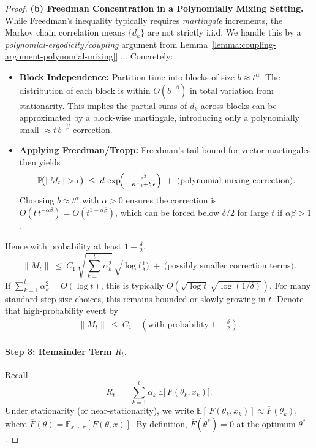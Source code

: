 \begin{proof}
\textbf{(b) Freedman Concentration in a Polynomially Mixing Setting.}\;\\
While Freedman’s inequality typically requires \emph{martingale} increments, the Markov chain correlation means $\{d_k\}$ are not strictly i.i.d.  We handle this by a \emph{polynomial-ergodicity/coupling} argument from Lemma~\ref{lemma:coupling-argument-polynomial-mixing}]{...}.  Concretely:
\begin{itemize}
\item \textbf{Block Independence:} Partition time into blocks of size $b\approx t^\alpha$.  The distribution of each block is within $O(b^{-\beta})$ in total variation from stationarity.  This implies the partial sums of $d_k$ across blocks can be approximated by a block-wise martingale, introducing only a polynomially small $\approx t\,b^{-\beta}$ correction.
\item \textbf{Applying Freedman/Tropp:} Freedman’s tail bound for vector martingales \cite{tropp2011freedman,freedman1975tail} then yields
\[
  \mathbb{P}\!\bigl(\|M_t\|>\epsilon\bigr)
  \;\le\;
  d\,
  \exp\!\Bigl(
     -\tfrac{\epsilon^2}{\kappa\,v_t + b\,\epsilon}
  \Bigr)
  \;+\;
  \text{(polynomial mixing correction)}.
\]
Choosing $b\approx t^\alpha$ with $\alpha>0$ ensures the correction is $O(t\,t^{-\alpha\beta})=O(t^{1-\alpha\beta})$, which can be forced below $\delta/2$ for large $t$ if $\alpha\beta>1$.
\end{itemize}
Hence with probability at least $1-\tfrac{\delta}{2}$,
\[
  \|M_t\|
  ~\le~
  C_1\,\sqrt{\sum_{k=1}^t\alpha_k^2}\,\sqrt{\log\bigl(\tfrac{1}{\delta}\bigr)}
  ~+~
  \text{(possibly smaller correction terms)}.
\]
If $\sum_{k=1}^t\alpha_k^2=O(\log t)$, this is typically $O(\sqrt{\log t}\,\sqrt{\log(1/\delta)})$.  For many standard step-size choices, this remains bounded or slowly growing in $t$.  Denote that high-probability event by
\begin{align}
\label{eq:Mt-bound-merged}
\|M_t\|
~\le~
C_1
\quad
(\text{with probability }1-\tfrac{\delta}{2}).
\end{align}

\paragraph{Step 3: Remainder Term \boldmath$R_t$.}

Recall
\[
  R_t
  ~=~
  \sum_{k=1}^t \alpha_k\,\mathbb{E}[\,F(\theta_k,x_k)\bigr].
\]
Under stationarity (or near-stationarity), we write $\mathbb{E}[\,F(\theta_k,x_k)]\approx \overline{F}(\theta_k)$, where $\overline{F}(\theta)=\mathbb{E}_{x\sim\pi}[F(\theta,x)]$.  By definition, $\overline{F}(\theta^*)=0$ at the optimum $\theta^*$.  


\end{proof}
